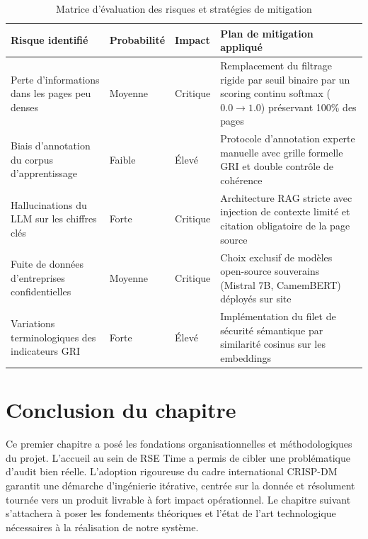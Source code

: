 \documentclass[12pt,a4paper]{report}
\begin{document}
\begin{table}[H]
    \centering
    \begin{tabular}{|p{3.5cm}|p{2cm}|p{2cm}|p{6.8cm}|}
        \hline
        \textbf{Risque identifié} & \textbf{Probabilité} & \textbf{Impact} & \textbf{Plan de mitigation appliqué} \\
        \hline
        Perte d'informations dans les pages peu denses & Moyenne & Critique & Remplacement du filtrage rigide par seuil binaire par un scoring continu softmax ($0.0 \rightarrow 1.0$) préservant 100\% des pages \\
        \hline
        Biais d'annotation du corpus d'apprentissage & Faible & Élevé & Protocole d'annotation experte manuelle avec grille formelle GRI et double contrôle de cohérence \\
        \hline
        Hallucinations du LLM sur les chiffres clés & Forte & Critique & Architecture RAG stricte avec injection de contexte limité et citation obligatoire de la page source \\
        \hline
        Fuite de données d'entreprises confidentielles & Moyenne & Critique & Choix exclusif de modèles open-source souverains (Mistral 7B, CamemBERT) déployés sur site \\
        \hline
        Variations terminologiques des indicateurs GRI & Forte & Élevé & Implémentation du filet de sécurité sémantique par similarité cosinus sur les embeddings \\
        \hline
    \end{tabular}
    \caption{Matrice d'évaluation des risques et stratégies de mitigation}
    \label{tab:matrice_risques}
\end{table}

\section{Conclusion du chapitre}
Ce premier chapitre a posé les fondations organisationnelles et méthodologiques du projet. L'accueil au sein de RSE Time a permis de cibler une problématique d'audit bien réelle. L'adoption rigoureuse du cadre international CRISP-DM garantit une démarche d'ingénierie itérative, centrée sur la donnée et résolument tournée vers un produit livrable à fort impact opérationnel. Le chapitre suivant s'attachera à poser les fondements théoriques et l'état de l'art technologique nécessaires à la réalisation de notre système.

\newpage

\end{document}

